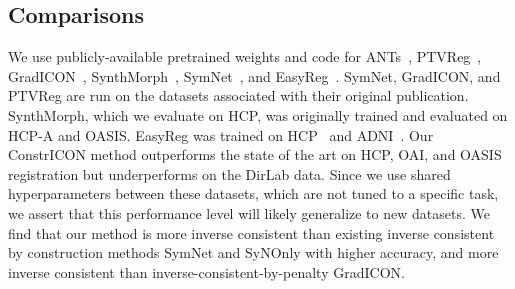 \subsection{Comparisons}
We use publicly-available pretrained weights and code for
ANTs~\cite{avants2008symmetric}, PTVReg~\cite{vishnevskiy2017isotropic},
GradICON~\cite{lin2022GradICON}, SynthMorph~\cite{hoffmann2022synthmorph},
SymNet~\cite{Mok_2020_CVPR}, and EasyReg~\cite{iglesias2023easyreg}. SymNet,
GradICON, and PTVReg are run on the datasets associated with their original
publication. SynthMorph, which we evaluate on HCP, was originally trained and
evaluated on HCP-A and OASIS. EasyReg was trained on HCP~\cite{van2012human}
and ADNI~\cite{adni}. Our ConstrICON method outperforms the state of the art on HCP, OAI, and OASIS registration but underperforms on the DirLab data.
Since we use shared hyperparameters between these datasets, which are not
tuned to a specific task, we assert that this performance level will likely
generalize to new datasets. We find that our method is more inverse
consistent than existing inverse consistent by construction methods SymNet
 and SyNOnly with higher accuracy, and more inverse consistent than
inverse-consistent-by-penalty GradICON.


